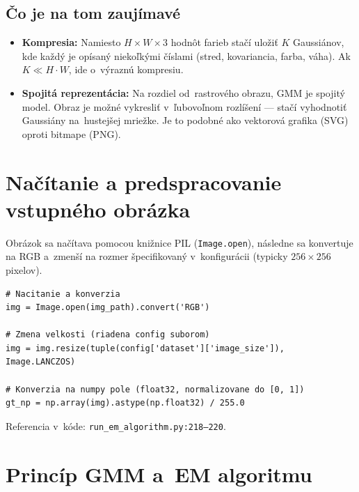 \documentclass[a4paper,11pt]{article}
\begin{document}
\subsection{Čo je na tom zaujímavé}

\begin{itemize}
  \item \textbf{Kompresia:} Namiesto $H \times W \times 3$ hodnôt farieb
        stačí uložiť $K$ Gaussiánov, kde každý je opísaný niekoľkými
        číslami (stred, kovariancia, farba, váha).  Ak $K \ll H \cdot W$,
        ide o~výraznú kompresiu.

  \item \textbf{Spojitá reprezentácia:} Na rozdiel od~rastrového obrazu,
        GMM je spojitý model.  Obraz je možné vykresliť v~ľubovoľnom
        rozlíšení --- stačí vyhodnotiť Gaussiány na~hustejšej mriežke.
        Je to podobné ako vektorová grafika (SVG) oproti bitmape (PNG).

\end{itemize}

\section{Načítanie a predspracovanie vstupného obrázka}
\label{sec:loading}

Obrázok sa načítava pomocou knižnice PIL (\texttt{Image.open}), následne sa
konvertuje na RGB a~zmenší na rozmer špecifikovaný v~konfigurácii (typicky
$256\times256$ pixelov).

\begin{lstlisting}
# Nacitanie a konverzia
img = Image.open(img_path).convert('RGB')

# Zmena velkosti (riadena config suborom)
img = img.resize(tuple(config['dataset']['image_size']), Image.LANCZOS)

# Konverzia na numpy pole (float32, normalizovane do [0, 1])
gt_np = np.array(img).astype(np.float32) / 255.0
\end{lstlisting}

\noindent
Referencia v~kóde: \texttt{run\_em\_algorithm.py:218--220}.

\section{Princíp GMM a~EM algoritmu}
\label{sec:math}
\end{document}
